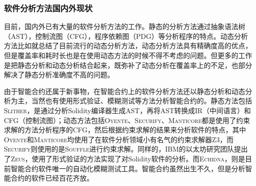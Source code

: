 \subsubsection{软件分析方法国内外现状}

目前，国内外已有大量的软件分析方法的工作。静态的分析方法通过抽象语法树（AST），控制流图（CFG），程序依赖图（PDG）等分析程序的特点。动态分析方法比如\cite{survey-dynamic}就总结了目前流行的动态分析方法，动态分析方法具有精确度高的优点，但是覆盖率和耗时长也是在使用动态方法的时候不得不考虑的问题。但更多的工作是把静态分析和动态分析结合起来，既弥补了动态分析在覆盖率上的不足，也部分解决了静态分析准确度不高的问题。

由于智能合约还属于新事物，在智能合约上的软件分析方法还以静态分析和动态分析为主，当然也有使用形式验证、模糊测试等方法分析智能合约的。静态方法包括\textsc{Slither}\cite{slither}，是通过分析Solidity编译器生成AST，再将AST转换成IR（中间语言）和CFG（控制流图）；动态方法包括\textsc{Oyente}\cite{oyente}、\textsc{Securify}\cite{securify}、\textsc{Manticore}\cite{manticore}都是使用了约束求解的方法分析程序的CFG，然后根据约束求解的结果来分析软件的特点，其中\textsc{Oyente}和\textsc{Manticore}均使用了在软件分析领域小有名气的约束求解器Z3\cite{z3}，而\textsc{Securify}则使用的是\textsc{Souffle}\cite{souffle}进行约束求解。同样的，IBM的以太坊研究团队提出了\textsc{Zeus}\cite{zeus}，使用了形式验证的方法实现了对Solidity软件的分析。而\textsc{Echidna}\cite{echidna}，则是目前智能合约软件唯一的自动化模糊测试工具。智能合约虽然出生不久，但是分析智能合约的软件已经百花齐放。

%

